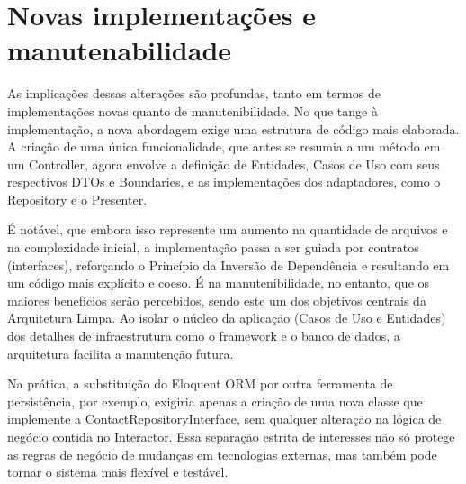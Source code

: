     \section{Novas implementações e manutenabilidade}

        \par As implicações dessas alterações são profundas, tanto em termos de implementações novas quanto de manutenibilidade. No que tange à implementação, a nova abordagem exige uma estrutura de código mais elaborada. A criação de uma única funcionalidade, que antes se resumia a um método em um Controller, agora envolve a definição de Entidades, Casos de Uso com seus respectivos DTOs e Boundaries, e as implementações dos adaptadores, como o Repository e o Presenter.
        
        \par É notável, que embora isso represente um aumento na quantidade de arquivos e na complexidade inicial, a implementação passa a ser guiada por contratos (interfaces), reforçando o Princípio da Inversão de Dependência e resultando em um código mais explícito e coeso. É na manutenibilidade, no entanto, que os maiores benefícios serão percebidos, sendo este um dos objetivos centrais da Arquitetura Limpa. Ao isolar o núcleo da aplicação (Casos de Uso e Entidades) dos detalhes de infraestrutura como o framework e o banco de dados, a arquitetura facilita a manutenção futura. 
        
        \par Na prática, a substituição do Eloquent ORM por outra ferramenta de persistência, por exemplo, exigiria apenas a criação de uma nova classe que implemente a ContactRepositoryInterface, sem qualquer alteração na lógica de negócio contida no Interactor. Essa separação estrita de interesses não só protege as regras de negócio de mudanças em tecnologias externas, mas também pode tornar o sistema mais flexível e testável.

      
